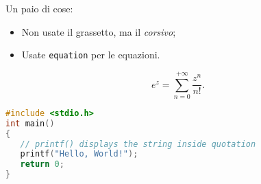 
Un paio di cose:
\begin{itemize}
\item Non usate il grassetto, ma il \emph{corsivo};
\item Usate \texttt{equation} per le equazioni.
\end{itemize}
\begin{equation}
e^{z}=\sum_{n=0}^{+\infty} \frac{z^n}{n!}.
\end{equation}

\lipsum[3]

\begin{lstlisting}[language=C]
#include <stdio.h>
int main()
{
   // printf() displays the string inside quotation
   printf("Hello, World!");
   return 0;
}
\end{lstlisting}